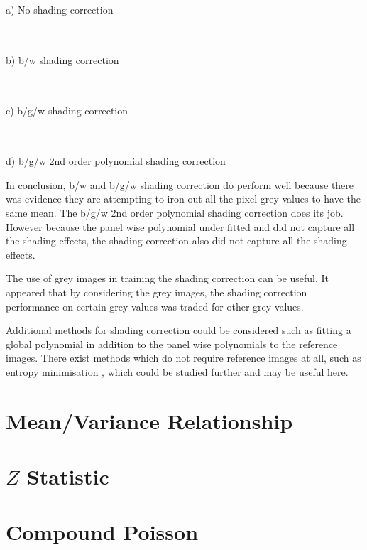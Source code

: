 \documentclass[a4paper]{proc}
\begin{document}
\begin{table*}
	\centering
	\begin{tabular}{c|c|c}
		
	\end{tabular}
	\\
	\vspace{.25cm}
	a) No shading correction
	\\\vspace{.5cm}
	\begin{tabular}{c|c|c}
		
	\end{tabular}
	\\
	\vspace{.25cm}
	b) b/w shading correction
	\\\vspace{.5cm}
	\begin{tabular}{c|c|c}
		
	\end{tabular}
	\\
	\vspace{.25cm}
	c) b/g/w shading correction
	\\\vspace{.5cm}
	\begin{tabular}{c|c|c}
		
	\end{tabular}
	\\
	\vspace{.25cm}
	d) b/g/w 2nd order polynomial shading correction
	\caption{Quartiles of the within pixel and between pixel variance after 20 repeats of the experiment.}
	\label{table:bgw_anova}
\end{table*}

In conclusion, b/w and b/g/w shading correction do perform well because there was evidence they are attempting to iron out all the pixel grey values to have the same mean. The b/g/w 2nd order polynomial shading correction does its job. However because the panel wise polynomial under fitted and did not capture all the shading effects, the shading correction also did not capture all the shading effects.

The use of grey images in training the shading correction can be useful. It appeared that by considering the grey images, the shading correction performance on certain grey values was traded for other grey values.

Additional methods for shading correction could be considered such as fitting a global polynomial in addition to the panel wise polynomials to the reference images. There exist methods which do not require reference images at all, such as entropy minimisation \cite{likar2000retrospective}, which could be studied further and may be useful here.

\section{Mean/Variance Relationship}

\section{$Z$ Statistic}

\section{Compound Poisson}



\end{document}
